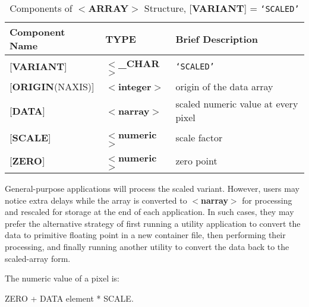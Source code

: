 \documentclass[twoside,11pt,nolof,noabs]{starlink}
\begin{document}
\begin{table}
\centering
\caption{Components of $<$\textbf{ARRAY}$>$ Structure, {[}\textbf{VARIANT}{]} = \texttt{`SCALED'}}
\begin{tabular}{|l|l|l|}
\hline
Component Name & TYPE & Brief Description \\ \hline
{[}\textbf{VARIANT}{]} & $<$\textbf{\_CHAR}$>$ & \texttt{`SCALED'} \\
{[}\textbf{ORIGIN}(NAXIS){]} & $<$\textbf{integer}$>$ & origin of the data array \\
{[}\textbf{DATA}{]} & $<$\textbf{narray}$>$ & scaled numeric value at every pixel \\
{[}\textbf{SCALE}{]} & $<$\textbf{numeric}$>$ & scale factor \\
{[}\textbf{ZERO}{]} & $<$\textbf{numeric}$>$ & zero point \\ \hline
\end{tabular}
\end{table}

General-purpose applications will process the scaled variant.
However, users may notice extra delays
while the array is converted to
$<$\textbf{narray}$>$ for processing
and rescaled for storage at the end of each application.  In such cases,
they may prefer the
alternative strategy of first running a utility application
to convert the data to primitive floating point in a new
container file, then performing their processing, and
finally running another utility to convert
the data back to the scaled-array
form.

The numeric value of a pixel is:
\begin{terminalv}
         ZERO + DATA element * SCALE.
\end{terminalv}
\end{document}
